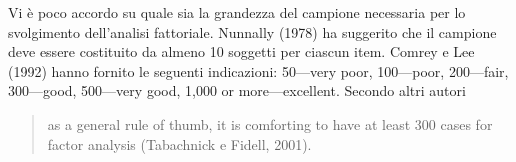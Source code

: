 Vi è poco accordo su quale sia la grandezza del campione necessaria per lo svolgimento dell'analisi fattoriale. Nunnally (1978) ha suggerito che il campione deve essere costituito da almeno 10 soggetti per ciascun item. Comrey e Lee (1992) hanno fornito le seguenti indicazioni: 50—very poor, 100—poor, 200—fair, 300—good, 500—very good, 1,000 or more—excellent. Secondo altri autori 
\begin{quote}
 as a general rule of thumb, it is comforting to have at least 300 cases for factor analysis (Tabachnick e Fidell, 2001). 
\end{quote}

